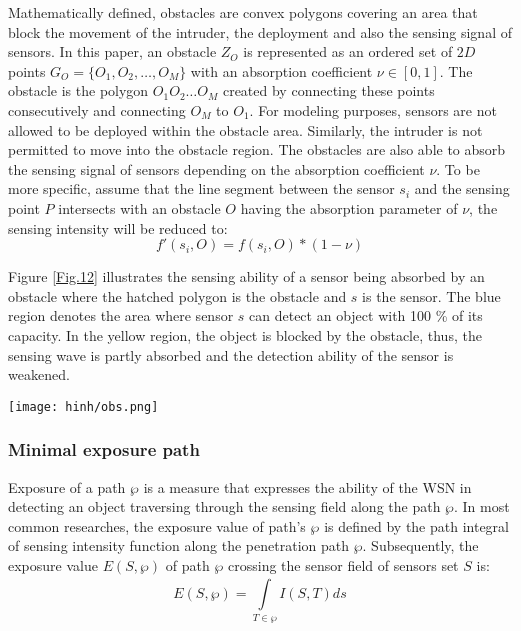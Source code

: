 \documentclass[final]{elsarticle}
\begin{document}
 Mathematically defined, obstacles are convex polygons covering an area that block the movement of the intruder, the deployment and also the sensing signal of sensors. In this paper, an obstacle $Z_O$ is represented as an ordered set of $2D$ points $ G_O = \{O_1, O_2,\ldots,O_M\}$ with an absorption coefficient $\nu \in [0,1]$. The obstacle is the polygon $O_1 O_2\ldots O_M $ created by connecting these points consecutively and connecting $O_M$ to $O_1$. For modeling purposes, sensors are not allowed to be deployed within the obstacle area. Similarly, the intruder is not permitted to move into the obstacle region. The obstacles are also able to absorb the sensing signal of sensors depending on the absorption coefficient $\nu$. To be more specific, assume that the line segment between the sensor $s_i$ and the sensing point $ P $ intersects with an obstacle $O$ having the absorption parameter of $\nu$, the sensing intensity will be reduced to: 
\begin{equation}
\label{eq5}
f'(s_i,O) = f(s_i,O) * (1-\nu) 
\end{equation}

Figure \ref{Fig.12} illustrates the sensing ability of a sensor being absorbed by an obstacle where the hatched polygon is the obstacle and $ s $  is the sensor. The blue region denotes the area where sensor $ s $ can detect an object with 100 \% of its capacity. In the yellow region, the object is blocked by the obstacle, thus, the sensing wave is partly absorbed and the detection ability of the sensor is weakened.
\begin{figure*}[h]
	\centering
	\texttt{[image: hinh/obs.png]}
	\caption{Sensing ability of a sensor being absorbed by an obstacle}
	\label{Fig.12}       %
\end{figure*}
\subsubsection{Minimal exposure path}
Exposure of a path $ \wp $ is a measure that expresses the ability of the WSN in detecting an object traversing through the sensing field along the path $ \wp $. In most common researches, the exposure value of path's $ \wp $ is defined by the path integral of sensing intensity function along the penetration path $ \wp $. Subsequently, the exposure value $  E(S,\wp ) $ of path $ \wp $ crossing the sensor field of sensors set $ S $ is:
\begin{equation}
\label{eq6}
E(S,\wp ) = \int\limits_{T \in \wp }^{} {I(S, T)} ds
\end{equation}
\end{document}
